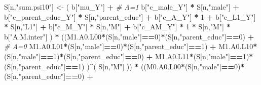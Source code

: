 \documentclass[
]{book}
\newenvironment{Shaded}{\begin{snugshade}}{\end{snugshade}}
\newcommand{\CommentTok}[1]{\textcolor[rgb]{0.56,0.35,0.01}{\textit{#1}}}
\newcommand{\DecValTok}[1]{\textcolor[rgb]{0.00,0.00,0.81}{#1}}
\newcommand{\NormalTok}[1]{#1}
\newcommand{\OtherTok}[1]{\textcolor[rgb]{0.56,0.35,0.01}{#1}}
\newcommand{\SpecialCharTok}[1]{\textcolor[rgb]{0.81,0.36,0.00}{\textbf{#1}}}
\newcommand{\StringTok}[1]{\textcolor[rgb]{0.31,0.60,0.02}{#1}}
\begin{document}
\begin{Shaded}
\begin{Highlighting}[]
\NormalTok{    S[n,}\StringTok{"sum.psi10"}\NormalTok{] }\OtherTok{\textless{}{-}}\NormalTok{  ( b[}\StringTok{"mu\_Y"}\NormalTok{] }\SpecialCharTok{+}                                          \CommentTok{\# A=1}
\NormalTok{                             b[}\StringTok{"c\_male\_Y"}\NormalTok{] }\SpecialCharTok{*}\NormalTok{ S[n,}\StringTok{"male"}\NormalTok{] }\SpecialCharTok{+} 
\NormalTok{                             b[}\StringTok{"c\_parent\_educ\_Y"}\NormalTok{] }\SpecialCharTok{*}\NormalTok{ S[n,}\StringTok{"parent\_educ"}\NormalTok{] }\SpecialCharTok{+} 
\NormalTok{                             b[}\StringTok{"c\_A\_Y"}\NormalTok{] }\SpecialCharTok{*} \DecValTok{1} \SpecialCharTok{+}
\NormalTok{                             b[}\StringTok{"c\_L1\_Y"}\NormalTok{] }\SpecialCharTok{*}\NormalTok{ S[n,}\StringTok{"L1"}\NormalTok{] }\SpecialCharTok{+}
\NormalTok{                             b[}\StringTok{"c\_M\_Y"}\NormalTok{] }\SpecialCharTok{*}\NormalTok{ S[n,}\StringTok{"M"}\NormalTok{] }\SpecialCharTok{+}
\NormalTok{                             b[}\StringTok{"c\_AM\_Y"}\NormalTok{] }\SpecialCharTok{*} \DecValTok{1} \SpecialCharTok{*}\NormalTok{ S[n,}\StringTok{"M"}\NormalTok{] }\SpecialCharTok{*}\NormalTok{ b[}\StringTok{"A.M.inter"}\NormalTok{] ) }\SpecialCharTok{*}
\NormalTok{      ((M1.A0.L00}\SpecialCharTok{*}\NormalTok{(S[n,}\StringTok{"male"}\NormalTok{]}\SpecialCharTok{==}\DecValTok{0}\NormalTok{)}\SpecialCharTok{*}\NormalTok{(S[n,}\StringTok{"parent\_educ"}\NormalTok{]}\SpecialCharTok{==}\DecValTok{0}\NormalTok{) }\SpecialCharTok{+}                    \CommentTok{\# A\textquotesingle{}=0}
\NormalTok{          M1.A0.L01}\SpecialCharTok{*}\NormalTok{(S[n,}\StringTok{"male"}\NormalTok{]}\SpecialCharTok{==}\DecValTok{0}\NormalTok{)}\SpecialCharTok{*}\NormalTok{(S[n,}\StringTok{"parent\_educ"}\NormalTok{]}\SpecialCharTok{==}\DecValTok{1}\NormalTok{) }\SpecialCharTok{+}
\NormalTok{          M1.A0.L10}\SpecialCharTok{*}\NormalTok{(S[n,}\StringTok{"male"}\NormalTok{]}\SpecialCharTok{==}\DecValTok{1}\NormalTok{)}\SpecialCharTok{*}\NormalTok{(S[n,}\StringTok{"parent\_educ"}\NormalTok{]}\SpecialCharTok{==}\DecValTok{0}\NormalTok{) }\SpecialCharTok{+} 
\NormalTok{          M1.A0.L11}\SpecialCharTok{*}\NormalTok{(S[n,}\StringTok{"male"}\NormalTok{]}\SpecialCharTok{==}\DecValTok{1}\NormalTok{)}\SpecialCharTok{*}\NormalTok{(S[n,}\StringTok{"parent\_educ"}\NormalTok{]}\SpecialCharTok{==}\DecValTok{1}\NormalTok{) )}\SpecialCharTok{\^{}}\NormalTok{( S[n,}\StringTok{"M"}\NormalTok{] )) }\SpecialCharTok{*}
\NormalTok{      ((M0.A0.L00}\SpecialCharTok{*}\NormalTok{(S[n,}\StringTok{"male"}\NormalTok{]}\SpecialCharTok{==}\DecValTok{0}\NormalTok{)}\SpecialCharTok{*}\NormalTok{(S[n,}\StringTok{"parent\_educ"}\NormalTok{]}\SpecialCharTok{==}\DecValTok{0}\NormalTok{) }\SpecialCharTok{+}                

\end{Highlighting}
\end{Shaded}
\end{document}
